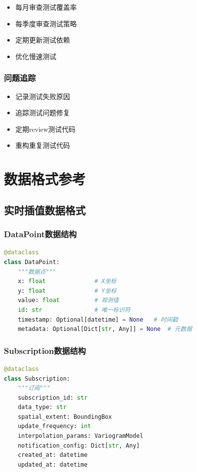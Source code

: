 \documentclass[12pt,a4paper,openany]{report}
\begin{document}
\begin{itemize}
    \item 每月审查测试覆盖率
    \item 每季度审查测试策略
    \item 定期更新测试依赖
    \item 优化慢速测试
\end{itemize}

\subsection{问题追踪}

\begin{itemize}
    \item 记录测试失败原因
    \item 追踪测试问题修复
    \item 定期review测试代码
    \item 重构重复测试代码
\end{itemize}

\appendix

\chapter{数据格式参考}

\section{实时插值数据格式}

\subsection{DataPoint数据结构}

\begin{lstlisting}[language=Python, caption=DataPoint数据结构]
@dataclass
class DataPoint:
    """数据点"""
    x: float              # X坐标
    y: float              # Y坐标
    value: float          # 观测值
    id: str               # 唯一标识符
    timestamp: Optional[datetime] = None   # 时间戳
    metadata: Optional[Dict[str, Any]] = None  # 元数据
\end{lstlisting}

\subsection{Subscription数据结构}

\begin{lstlisting}[language=Python, caption=Subscription数据结构]
@dataclass
class Subscription:
    """订阅"""
    subscription_id: str
    data_type: str
    spatial_extent: BoundingBox
    update_frequency: int
    interpolation_params: VariogramModel
    notification_config: Dict[str, Any]
    created_at: datetime
    updated_at: datetime
\end{lstlisting}
\end{document}
